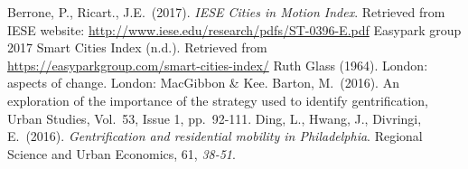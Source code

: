 \documentclass[a4paper, 10pt, conference]{ieeeconf}      %
\begin{document}


\begin{thebibliography}{99}

 Berrone, P., Ricart., J.E.\ (2017). \emph{IESE Cities in Motion Index}. Retrieved from IESE website: \url{http://www.iese.edu/research/pdfs/ST-0396-E.pdf}
 Easypark group 2017 Smart Cities Index (n.d.). Retrieved from \url{https://easyparkgroup.com/smart-cities-index/}
 Ruth Glass (1964). London: aspects of change. London: MacGibbon \& Kee.
 Barton, M.\ (2016). An exploration of the importance of the strategy used to identify gentrification, Urban Studies, Vol.\ 53, Issue 1, pp.\ 92-111.
 Ding, L., Hwang, J., Divringi, E.\ (2016). \emph{Gentrification and residential mobility in Philadelphia}. Regional Science and Urban Economics, 61, \emph{38-51}.

\end{thebibliography}
\end{document}
